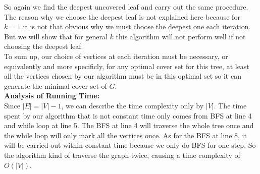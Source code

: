 \documentclass[12pt,letterpaper]{article}
\begin{document}
So again we find the deepest uncovered leaf and carry out the same procedure.
The reason why we choose the deepest leaf is not explained here because
for $k=1$ it is not that obvious why we must choose the deepest one each iteration.
But we will show that for general $k$ this algorithm will not perform well
if not choosing the deepest leaf.\\
To sum up, our choice of vertices at each iteration must be necessary,
or equivalently and more specificly, for any optimal cover set for this tree,
at least all the vertices chosen by our algorithm must be in this optimal set 
so it can generate the minimal cover set of $G$.\\
\textbf{Analysis of Running Time:}\\
Since $|E|=|V|-1$, we can describe the time complexity only by $|V|$.
The time spent by our algorithm that is not constant time only comes from
BFS at line 4 and while loop at line 5.
The BFS at line 4 will traverse the whole tree once
and the while loop will only mark all the vertices once.
As for the BFS at line 8,
it will be carried out within constant time because we only do BFS for one step.
So the algorithm kind of traverse the graph twice,
causing a time complexity of $O(|V|)$.

\newpage
\end{document}
